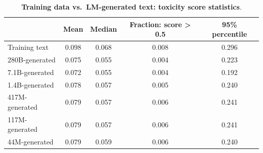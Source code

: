 \documentclass[11pt, a4paper, logo, internal, copyright, nonumbering]{deepmind}
\begin{document}
\begin{table}[h]
    \centering
    \begin{tabular}{lcccc}
    \toprule
    &Mean 
    &Median 
    &Fraction: score > 0.5
    &95\% percentile\\
    \midrule
    Training text&	0.098&	0.068&	0.008&	0.296\\
    \midrule
    280B-generated&	0.075&	0.055&	0.004&	0.223\\
    7.1B-generated&	0.072&	0.055&	0.004&	0.192\\
    1.4B-generated& 0.078&  0.057&  0.005&  0.240\\
    417M-generated& 0.079&	0.057&	0.006&  0.241\\
    117M-generated& 0.079&  0.057&  0.006&  0.241\\
    44M-generated&  0.079&  0.059&  0.006&  0.240\\
    \bottomrule
    \end{tabular}
\caption{\textbf{Training data vs.~LM-generated text: toxicity score statistics}.}
    \label{tab:toxicity_subset}
\end{table}
\end{document}
